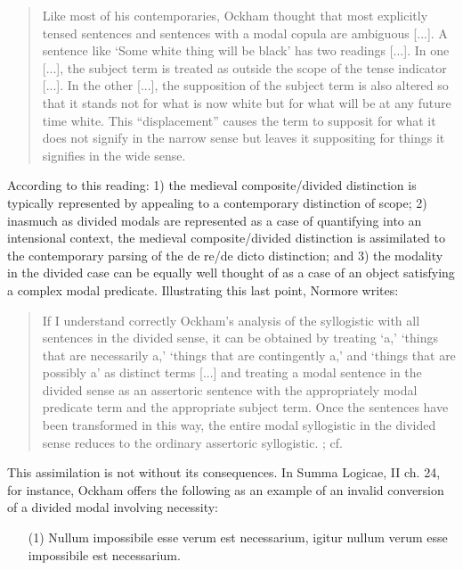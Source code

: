 \documentclass[a4paper]{article}
\begin{document}
\begin{quote}
Like most of his contemporaries, Ockham thought that most explicitly tensed sentences and sentences with a modal copula are ambiguous [...]. A sentence like `Some white thing will be black' has two readings [...]. In one [...], the subject term is treated as outside the scope of the tense indicator [...]. In the other [...], the supposition of the subject term is also altered so that it stands not for what is now white but for what will be at any future time white. This “displacement” causes the term to supposit for what it does not signify in the narrow sense but leaves it suppositing for things it signifies in the wide sense. \cite[pp. 39-40]{Normore1999}
\end{quote}


According to this reading: 1) the medieval composite/divided distinction is typically represented by appealing to a contemporary distinction of scope; 2) inasmuch as divided modals are represented as a case of quantifying into an intensional context, the medieval composite/divided distinction is assimilated to the contemporary parsing of the de re/de dicto distinction;  and 3) the modality in the divided case can be equally well thought of as a case of an object satisfying a complex modal predicate. Illustrating this last point, Normore writes: 

\begin{quote}
If I understand correctly Ockham's analysis of the syllogistic with all sentences in the divided sense, it can be obtained by treating `a,' `things that are necessarily a,' `things that are contingently a,' and `things that are possibly a' as distinct terms [...] and treating a modal sentence in the divided sense as an assertoric sentence with the appropriately modal predicate term and the appropriate subject term. Once the sentences have been transformed in this way, the entire modal syllogistic in the divided sense reduces to the ordinary assertoric syllogistic. \cite[p. 49]{Normore1999}; cf. \cite{DutilhNovaes2004}
\end{quote}

This assimilation is not without its consequences. In Summa Logicae, II ch. 24, for instance, Ockham offers the following as an example of an invalid conversion of a divided modal involving necessity: 
\begin{enumerate} 
\item[(1)] Nullum impossibile esse verum est necessarium, igitur nullum verum esse impossibile est necessarium. \cite[p. 298]{OckhamSL2}
\end{enumerate}
\end{document}
